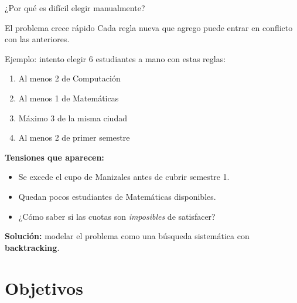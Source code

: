 \documentclass[aspectratio=169, 10pt]{beamer}
\begin{document}
\begin{frame}{¿Por qué es difícil elegir manualmente?}
  \begin{alertblock}{El problema crece rápido}
    Cada regla nueva que agrego puede entrar en conflicto con las anteriores.
  \end{alertblock}

  \vspace{0.3cm}
  Ejemplo: intento elegir 6 estudiantes a mano con estas reglas:
  \begin{enumerate}
    \item Al menos 2 de Computación
    \item Al menos 1 de Matemáticas
    \item Máximo 3 de la misma ciudad
    \item Al menos 2 de primer semestre
  \end{enumerate}

  \vspace{0.3cm}
  \textbf{Tensiones que aparecen:}
  \begin{itemize}
    \item Se excede el cupo de Manizales antes de cubrir semestre 1.
    \item Quedan pocos estudiantes de Matemáticas disponibles.
    \item ¿Cómo saber si las cuotas son \emph{imposibles} de satisfacer?
  \end{itemize}

  \vspace{0.3cm}
  \textbf{Solución:} modelar el problema como una búsqueda sistemática con \textbf{backtracking}.
\end{frame}


\section{Objetivos}
\end{document}
